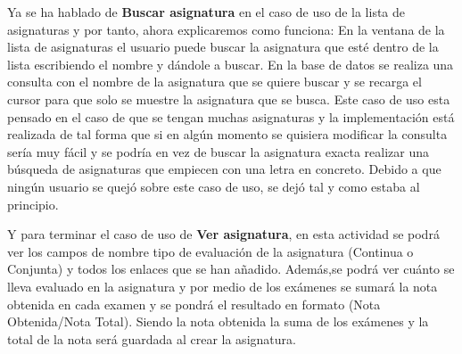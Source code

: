 Ya se ha hablado de \textbf{Buscar asignatura} en el caso de uso de la lista de asignaturas y por tanto, ahora explicaremos como funciona:
En la ventana de la lista de asignaturas el usuario puede buscar la asignatura que esté dentro de la lista escribiendo el nombre y dándole a buscar.
En la base de datos se realiza una consulta con el nombre de la asignatura que se quiere buscar y se recarga el cursor para que solo se muestre la asignatura que se busca.
Este caso de uso esta pensado en el caso de que se tengan muchas asignaturas y la implementación está realizada de tal forma que si en algún momento se quisiera modificar la consulta sería muy fácil y se podría en vez de buscar la asignatura exacta realizar una búsqueda de asignaturas que empiecen con una letra en concreto.
Debido a que ningún usuario se quejó sobre este caso de uso, se dejó tal y como estaba al principio.

Y para terminar el caso de uso de \textbf{Ver asignatura}, en esta actividad se podrá ver los campos de nombre tipo de evaluación de la asignatura (Continua o Conjunta) y todos los enlaces que se han añadido. Además,se podrá ver cuánto se lleva evaluado en la asignatura y por medio de los exámenes se sumará la nota obtenida en cada examen y se pondrá el resultado en formato (Nota Obtenida/Nota Total).
Siendo la nota obtenida la suma de los exámenes y la total de la nota será guardada al crear la asignatura.


